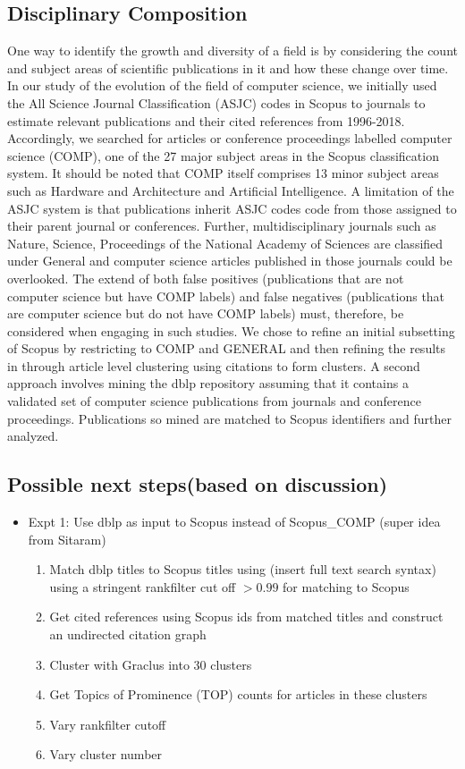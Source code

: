 \documentclass[11pt, oneside]{article}   	%
\begin{document}
\subsection{Disciplinary Composition} One way to identify the growth and diversity of a field is by considering the count and subject areas of scientific publications in it and how these change over time. In our study of the evolution of the field of computer science, we initially used the All Science Journal Classification (ASJC) codes in Scopus to journals to estimate relevant publications and their cited references from 1996-2018. Accordingly, we searched for articles or conference proceedings labelled computer science (COMP), one of the 27 major subject areas in the Scopus classification system. It should be noted that COMP itself comprises 13 minor subject areas such as Hardware and Architecture and Artificial Intelligence. A limitation of the ASJC system is that publications inherit ASJC codes code from those assigned to their parent journal or conferences.  Further, multidisciplinary journals such as Nature, Science, Proceedings of the National Academy of Sciences are classified under General and computer science articles published in those journals could be overlooked. The extend of both false positives (publications that are not computer science but have COMP labels) and false negatives (publications that are computer science but do not have COMP labels) must, therefore, be considered when engaging in such studies. We chose to refine an initial subsetting of Scopus by restricting to COMP and GENERAL and then refining the results in through article level clustering using citations to form clusters. A second approach involves mining the dblp repository assuming that it contains a validated set of computer science publications from journals and conference proceedings. Publications so mined are matched to Scopus identifiers and further analyzed. 

\subsection{Possible next steps(based on discussion)}  

\begin{itemize}
\item Expt 1: Use dblp as input to Scopus instead of Scopus\_COMP (super idea from Sitaram)
\begin{enumerate}
\item Match dblp titles to Scopus titles using (insert full text search syntax) using a stringent rankfilter cut off $> 0.99$ for matching to Scopus 
\item Get cited references using Scopus ids from matched titles and construct an undirected citation graph
\item Cluster with Graclus into 30 clusters
\item Get Topics of Prominence (TOP) counts for articles in these clusters 
\item Vary rankfilter cutoff
\item Vary cluster number
\end{enumerate}
\end{itemize}
\end{document}
